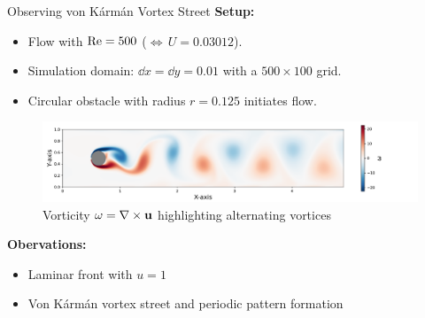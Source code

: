 \begin{frame}{Observing von Kármán Vortex Street}
    \textbf{Setup:}
    \begin{itemize}
        \item Flow with $\mathrm{Re} = 500$ ($ \Leftrightarrow\, U = 0.03012$).
        \item Simulation domain: $\dd{x} = \dd{y} = 0.01 $ with a $500 \times 100$ grid.
        \item Circular obstacle with radius $r = 0.125$ initiates flow.
    \end{itemize}
    \vspace{-0.25cm}
    \begin{figure}
        \centering
        \hspace*{0.3cm}
        \includegraphics[width=1.1\linewidth]{graphics/numeric/vor_25_sim.pdf}
        \caption{Vorticity $\omega = \nabla \times \boldsymbol{\mathrm{u}}$ highlighting alternating vortices}
        \label{fig: first_obs}
    \end{figure}
    \vspace{-0.25cm}
    \textbf{Obervations:}
    \begin{itemize}
        \item Laminar front with $u = 1$
        \item Von Kármán vortex street and periodic pattern formation
    \end{itemize}
\end{frame}

